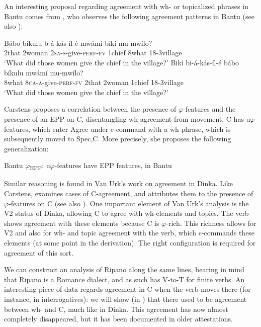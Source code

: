 \documentclass[output=paper
,modfonts
,nonflat]{langsci/langscibook}
\begin{document}
An interesting proposal regarding agreement with wh- or topicalized phrases in Bantu comes from \citet{Carstens2005a}, who observes the following agreement patterns in Bantu (see also ):

\begin{exe}
\ex \citet[220]{Carstens2005a} \xlist
\ex
\gll Bábo bíkulu   b-á-kás-íl-é     mwámí bíkí mu-mwílo?\\
	2that   2woman   \textsc{2sa-s}{}-give-\textsc{perf-fv} 1chief 8what  18-3village\\ 
\glt `What did those women give the chief in the village?'
\ex
\gll Bikí   bi-á-kás-íl-é   bábo bíkulu   mwámí   mu-mwílo?\\
	8what   \textsc{8ca-a-}give-\textsc{perf-fv} 2that 2woman 1chief 18-3village \\
\glt `What did those women give the chief in the village?'
\endxlist
\end{exe}
Carstens proposes a correlation between the presence of $\varphi $-features and the presence of an EPP on C, disentangling wh-agreement from movement. C has u$\varphi $-features, which enter Agree under c-command with a wh-phrase, which is subsequently moved to Spec,C. More precisely, she proposes the following generalization:

\begin{exe}
\ex Bantu $\varphi $\textsubscript{EPP}: u$\varphi $-features have EPP features, in Bantu \citep[222]{Carstens2005a}
\end{exe}
Similar reasoning is found in Van Urk’s work on agreement in Dinka. Like Carstens, \citet{Van_Urk2015} examines cases of C-agreement, and attributes them to the presence of $\varphi $-features on C (see also \citealt{Haegeman_Van_Koppen2012}). One important element of Van Urk’s analysis is the V2 status of Dinka, allowing C to agree with wh-elements and topics. The verb shows agreement with these elements because C is $\varphi $-rich. This richness allows for V2 and also for wh- and topic agreement with the verb, which c-commands these elements (at some point in the derivation). The right configuration is required for agreement of this sort.

We can construct an analysis of Ripano along the same lines, bearing in mind that Ripano is a Romance dialect, and as such has V-to-T for finite verbs. An interesting piece of data regards agreement in C when the verb moves there (for instance, in interrogatives): we will show (in ) that there used to be agreement between wh- and C, much like in Dinka. This agreement has now almost completely disappeared, but it has been documented in older attestations.
\end{document}
